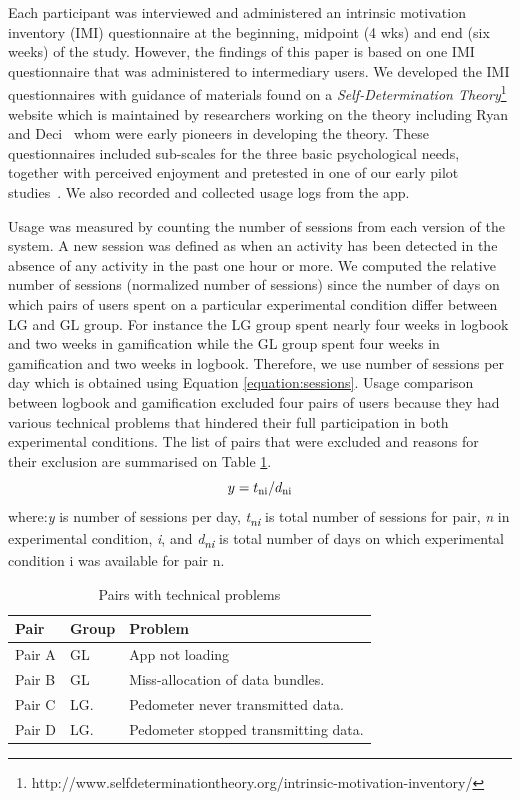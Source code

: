 \documentclass{sig-alternate}
\def\SB#1{\textsubscript{\textcolor{black}{#1}}}
\begin{document}
Each participant was interviewed and administered an intrinsic motivation inventory (IMI) questionnaire at the beginning, midpoint (4 wks) and end (six weeks) of the study. However, the findings of this paper is based on one IMI questionnaire that was administered to intermediary users. We developed the IMI questionnaires with guidance of materials found on a \emph{Self-Determination Theory}\footnote{http://www.selfdeterminationtheory.org/intrinsic-motivation-inventory/} website which is maintained by researchers working on the theory including  Ryan and Deci~\cite{deci1985:intrinsic} whom were early pioneers in developing the theory. These questionnaires included sub-scales for the three basic psychological needs, together with perceived enjoyment and pretested in one of our early pilot studies~\cite{katule2016:leveraging}.  We also recorded and collected usage logs from the app.

Usage was measured by counting the number of sessions from each version of the system. A new session was defined as when an activity has been detected in the absence of any activity in the past one hour or more. We computed the relative number of sessions (normalized number of sessions) since the number of days on which pairs of users spent on a particular experimental condition differ between LG and GL group. For instance the LG group spent nearly four weeks in logbook and two weeks in gamification while the GL group spent four weeks in gamification and two weeks in logbook. Therefore, we use number of sessions per day which is obtained using Equation \ref{equation:sessions}. Usage comparison between logbook and gamification excluded four pairs of users because they had various technical problems that hindered their full participation in both experimental conditions. The list of pairs that were excluded and reasons for their exclusion are summarised on Table \ref{table:usageproblems}.
\begin{equation}
\label{equation:sessions}
y=t\SB{ni}/d\SB{ni}
\end{equation}
where:\emph{y} is number of sessions per day, \emph{t\SB{ni}} is total number of sessions for pair, \emph{n} in experimental condition, \emph{i}, and \emph{d\SB{ni}} is total number of days on which experimental condition i was available for pair n.
\begin{table}%
  \begin{center}
    \caption{Pairs with technical problems}
    \label{table:usageproblems}
	\begin{tabular}{|p{0.95cm}|p{0.75cm}|p{5.4cm}|}
		\hline
		Pair&Group&Problem\\
		\hline
		Pair A&GL &App not loading\\
		\hline
		Pair B&GL& Miss-allocation of data bundles.\\
		\hline
		Pair C & LG.& Pedometer never transmitted data.\\
		\hline
		Pair D & LG.& Pedometer stopped transmitting data.\\
	\hline
	\end{tabular}
  \end{center}
\end{table}
\end{document}
